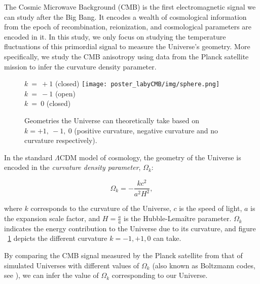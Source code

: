 The Cosmic Microwave Background (CMB) is the first electromagnetic signal we can study after the Big Bang. It encodes a wealth of cosmological information from the epoch of recombination, reionization, and cosmological parameters are encoded in it. In this study, we only focus on studying the temperature fluctuations of this primordial signal to measure the Universe's geometry. More specifically, we study the CMB anisotropy using data from the Planck satellite mission to infer the curvature density parameter.

\vspace{1.5cm}
\begin{figure}
\subfloat $k\ =\ +1$ (closed) {\texttt{[image: poster\_labyCMB/img/sphere.png]}} \hspace{1.5cm} 
 $k\ =\ -1$ (open)\\ \vspace{1.5cm} \hspace{5cm}
 $k\ =\ 0$ (closed) \vspace{1cm}
\caption{Geometries the Universe can theoretically take based on $k=+1, \ -1, \ 0$ (positive curvature, negative curvature and no curvature respectively).}
\label{fig:geometries}
\end{figure}


In the standard $\Lambda$CDM model of cosmology, the geometry of the Universe is encoded in the \textit{curvature density parameter}, $\Omega_k$:

\begin{equation}
    \Omega_{k}=-\frac{k c^{2}}{a^{2} H^{2}},
\end{equation}
\vspace{1em} 

where $k$ corresponds to the curvature of the Universe, $c$ is the speed of light, $a$ is the expansion scale factor, and $H = \frac{\dot{a}}{a}$ is the Hubble-Lemaître parameter. $\Omega_k$ indicates the energy contribution to the Universe due to its curvature, and figure ~\ref{fig:geometries} depicts the different curvature $k = −1, +1, 0$ can take.
\vspace{1em} 

By comparing the CMB signal measured by the Planck satellite from that of simulated Universes with different values of $\Omega_k$ (also known as Boltzmann codes, see \cite{lesgourgues:2011}), we can infer the value of $\Omega_k$ corresponding to our Universe. 
